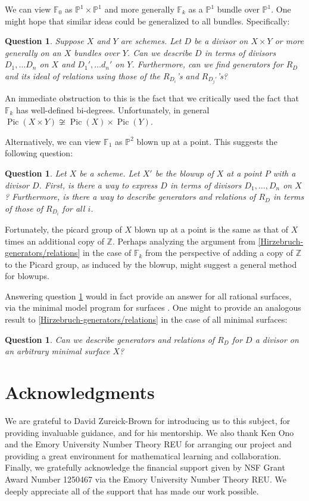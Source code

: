 \documentclass{amsart}
\theoremstyle{plain}
\newtheorem{question}[thm]{Question}
\theoremstyle{definition}
\theoremstyle{remark}
\numberwithin{equation}{section}
\newcommand\bz{{\mathbb Z}}
\newcommand\hirz{\mathbb{F}}
\DeclareMathOperator{\Pic}{Pic}
\begin{document}
We can view $\hirz_0$ as $\mathbb{P}^1\times \mathbb{P}^1$ and more generally $\hirz_k$ as a $\mathbb{P}^1$ bundle over $\mathbb{P}^1$.  One might hope that similar ideas could be generalized to all bundles.  Specifically:
\begin{question}\label{qn:general-product/bundle}
Suppose $X$ and $Y$ are schemes.  Let $D$ be a divisor on $X\times Y$ or more generally on an $X$ bundles over $Y$.  Can we describe $D$ in terms of divisors $D_1, \ldots D_n$ on $X$ and $D_1', \ldots d_n'$ on $Y$.  Furthermore, can we find generators for $R_D$ and its ideal of relations using those of the $R_{D_i}$'s and $R_{D_j'}$'s?
\end{question}
An immediate obstruction to this is the fact that we critically used the fact that $\hirz_k$ has well-defined bi-degrees.  Unfortunately, in general $\Pic(X \times Y) \not \cong \Pic(X) \times \Pic(Y)$.

Alternatively, we can view $\hirz_1$ as $\mathbb{P}^2$ blown up at a point.  This suggests the following question:
\begin{question}\label{qn:general-blowup}
Let $X$ be a scheme.  Let $X'$ be the blowup of $X$ at a point $P$ with a divisor $D$.  First, is there a way to express $D$ in terms of divisors $D_1, \ldots, D_n$ on $X$?  Furthermore, is there a way to describe generators and relations of $R_D$ in terms of those of $R_{D_i}$ for all $i$.
\end{question}
Fortunately, the picard group of $X$ blown up at a point is the same as that of $X$ times an additional copy of $\bz$.  Perhaps analyzing the argument from \ref{Hirzebruch-generators/relations} in the case of $\hirz_k$ from the perspective of adding a copy of $\mathbb{Z}$ to the Picard group, as induced by the blowup, might suggest a general method for blowups.

Answering question \ref{qn:general-blowup} would in fact provide an answer for all rational surfaces, via the minimal model program for surfaces .  One might to provide an analogous result to \ref{Hirzebruch-generators/relations} in the case of all minimal surfaces:
\begin{question}\label{qn:general-minimal-surface}
Can we describe generators and relations of $R_D$ for $D$ a divisor on an arbitrary minimal surface $X$?
\end{question}


\section{Acknowledgments}
We are grateful to David Zureick-Brown for introducing us to this
subject, for providing invaluable guidance,
and for his mentorship. We also thank Ken Ono and the
Emory University Number Theory REU for arranging our project and
providing a great environment for mathematical learning and
collaboration.
Finally, we gratefully acknowledge the financial support given by
NSF Grant Award Number 1250467 via the Emory University Number
Theory REU. We deeply appreciate all of the support that has made
our work possible.


\nocite{*}
{}

\end{document}
